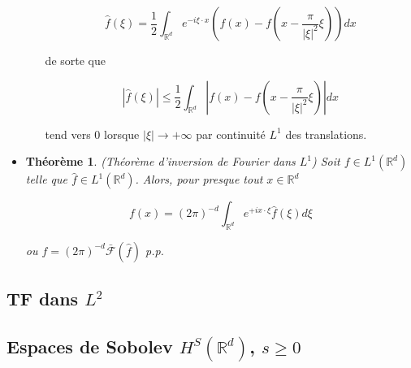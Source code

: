 \documentclass[10pt,a4paper,oneside]{article}
\newtheorem{theoreme}{Théorème}
\begin{document}
\begin{itemize}
\begin{itemize}
\[ \hat{f}(\xi) = \frac{1}{2} \int_{\mathbb{R}^d} e^{-i \xi \cdot x} \left( f(x) - f(x - \frac{\pi}{|\xi|^2}\xi) \right) dx \]

de sorte que

\[ |\hat{f}(\xi)| \leq \frac{1}{2} \int_{\mathbb{R}^d} | f(x) - f(x - \frac{\pi}{|\xi|^2}\xi) | dx \]

tend vers 0 lorsque $|\xi| \to +\infty$ par continuité $L^1$ des translations.

\end{itemize}

\item
\begin{theoreme}
(Théorème d'inversion de Fourier dans $L^1$)
Soit $f \in L^1(\mathbb{R}^d)$ telle que $\hat{f} \in L^1(\mathbb{R}^d)$. Alors, pour presque tout $x \in \mathbb{R}^d$

\[ f(x) = (2\pi)^{-d} \int_{\mathbb{R}^d} e^{+i x \cdot \xi} \hat{f}(\xi) d\xi \]

ou $f = (2\pi)^{-d} \bar{\mathcal{F}}(\hat{f})$ p.p.
\end{theoreme}

\end{itemize}

\subsection{TF dans $L^2$}

\subsection{Espaces de Sobolev $H^S(\mathbb{R}^d)$, $s \geq 0$}
\end{document}
